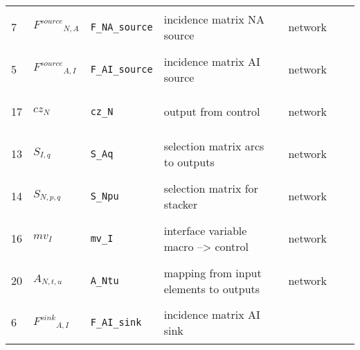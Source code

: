 \begin{longtable}{|p{1cm}|p{2.5cm}|p{4.5cm}|p{8cm}|p{3.0cm}|p{3cm}|p{1cm}|}
            7
             & \hypertarget{"v:7"}{ $ {{F^{source}}}{_{N, A}} $}
             & \verb|F_NA_source|
             & incidence matrix NA source
             & \begin{lay}network \end{lay}
             & $  $
             & \\
            5
             & \hypertarget{"v:5"}{ $ {{F^{source}}}{_{A, I}} $}
             & \verb|F_AI_source|
             & incidence matrix AI source
             & \begin{lay}network \end{lay}
             & $  $
             & \\
            17
             & \hypertarget{"v:17"}{ $ {{cz}}{_{N}} $}
             & \verb|cz_N|
             & output from control
             & \begin{lay}network \end{lay}
             & $  $
             & \\
            13
             & \hypertarget{"v:13"}{ $ {{S}}{_{I, q}} $}
             & \verb|S_Aq|
             & selection matrix arcs to outputs
             & \begin{lay}network \end{lay}
             & $  $
             & \\
            14
             & \hypertarget{"v:14"}{ $ {{S}}{_{N, p, q}} $}
             & \verb|S_Npu|
             & selection matrix for stacker
             & \begin{lay}network \end{lay}
             & $  $
             & \\
            16
             & \hypertarget{"v:16"}{ $ {{mv}}{_{I}} $}
             & \verb|mv_I|
             & interface variable macro --> control
             & \begin{lay}network \end{lay}
             & $  $
             & \\
            20
             & \hypertarget{"v:20"}{ $ {{A}}{_{N, t, u}} $}
             & \verb|A_Ntu|
             & mapping from input elements to outputs
             & \begin{lay}network \end{lay}
             & $  $
             & \\
            6
             & \hypertarget{"v:6"}{ $ {{F^{sink}}}{_{A, I}} $}
             & \verb|F_AI_sink|
             & incidence matrix AI sink

\end{longtable}
